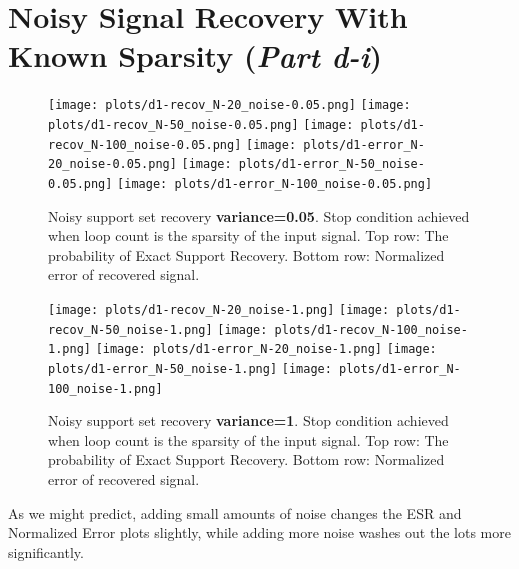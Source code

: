\documentclass{article}
\begin{document}

\newpage
\section*{Noisy Signal Recovery With Known Sparsity ({\it Part d-i})}


\begin{figure}[H]
    \captionsetup{width=.75\linewidth}
    \centering
        \texttt{[image: plots/d1-recov\_N-20\_noise-0.05.png]}
        \texttt{[image: plots/d1-recov\_N-50\_noise-0.05.png]}
        \texttt{[image: plots/d1-recov\_N-100\_noise-0.05.png]}
        \newline
        \texttt{[image: plots/d1-error\_N-20\_noise-0.05.png]}
        \texttt{[image: plots/d1-error\_N-50\_noise-0.05.png]}
        \texttt{[image: plots/d1-error\_N-100\_noise-0.05.png]}
        \caption{Noisy support set recovery {\bf variance=0.05}. Stop condition achieved when loop count is the sparsity of the input signal. Top row: The probability of Exact Support Recovery. Bottom row: Normalized error of recovered signal.}
\end{figure}


\begin{figure}[H]
    \captionsetup{width=.75\linewidth}
    \centering
        \texttt{[image: plots/d1-recov\_N-20\_noise-1.png]}
        \texttt{[image: plots/d1-recov\_N-50\_noise-1.png]}
        \texttt{[image: plots/d1-recov\_N-100\_noise-1.png]}
        \newline
        \texttt{[image: plots/d1-error\_N-20\_noise-1.png]}
        \texttt{[image: plots/d1-error\_N-50\_noise-1.png]}
        \texttt{[image: plots/d1-error\_N-100\_noise-1.png]}
        \caption{Noisy support set recovery {\bf variance=1}. Stop condition achieved when loop count is the sparsity of the input signal. Top row: The probability of Exact Support Recovery. Bottom row: Normalized error of recovered signal.}
\end{figure}


As we might predict, adding small amounts of noise changes the ESR and Normalized Error plots slightly, while adding more noise washes out the lots more significantly.
\end{document}
